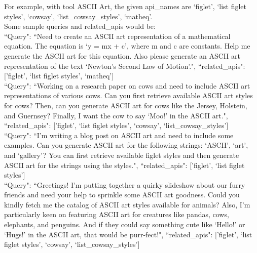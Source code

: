 For example, with tool ASCII Art, the given api\_names are `figlet', `list figlet styles', `cowsay', `list\_cowsay\_styles', `matheq'. \\
Some sample queries and related\_apis would be: \\
``Query": ``Need to create an ASCII art representation of a mathematical equation. The equation is `y = mx + c', where m and c are constants. Help me generate the ASCII art for this equation. Also please generate an ASCII art representation of the text `Newton's Second Law of Motion'.", ``related\_apis": ['figlet', `list figlet styles', `matheq'] \\
``Query": ``Working on a research paper on cows and need to include ASCII art representations of various cows. Can you first retrieve available ASCII art styles for cows? Then, can you generate ASCII art for cows like the Jersey, Holstein, and Guernsey? Finally, I want the cow to say `Moo!' in the ASCII art.", ``related\_apis": ['figlet', `list figlet styles', `cowsay', `list\_cowsay\_styles'] \\
``Query": ``I'm writing a blog post on ASCII art and need to include some examples. Can you generate ASCII art for the following strings: `ASCII', `art', and `gallery'? You can first retrieve available figlet styles and then generate ASCII art for the strings using the styles.", ``related\_apis": ['figlet', `list figlet styles'] \\
``Query": ``Greetings! I'm putting together a quirky slideshow about our furry friends and need your help to sprinkle some ASCII art goodness. Could you kindly fetch me the catalog of ASCII art styles available for animals? Also, I'm particularly keen on featuring ASCII art for creatures like pandas, cows, elephants, and penguins. And if they could say something cute like `Hello!' or `Hugs!' in the ASCII art, that would be purr-fect!", ``related\_apis": ['figlet', `list figlet styles', `cowsay', `list\_cowsay\_styles'] \\

